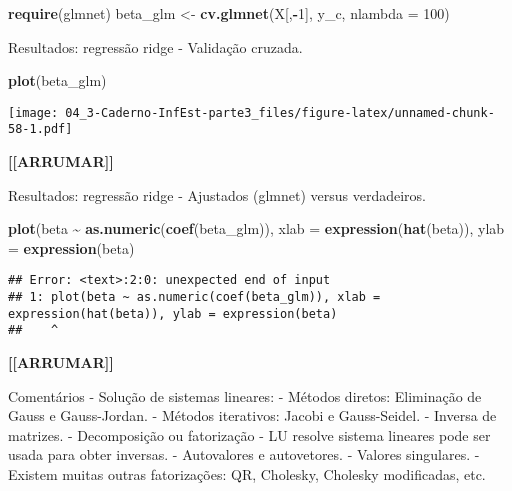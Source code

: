 \documentclass[
]{article}
\newenvironment{Shaded}{\begin{snugshade}}{\end{snugshade}}
\newcommand{\AttributeTok}[1]{\textcolor[rgb]{0.13,0.29,0.53}{#1}}
\newcommand{\DecValTok}[1]{\textcolor[rgb]{0.00,0.00,0.81}{#1}}
\newcommand{\FunctionTok}[1]{\textcolor[rgb]{0.13,0.29,0.53}{\textbf{#1}}}
\newcommand{\NormalTok}[1]{#1}
\newcommand{\OtherTok}[1]{\textcolor[rgb]{0.56,0.35,0.01}{#1}}
\newcommand{\SpecialCharTok}[1]{\textcolor[rgb]{0.81,0.36,0.00}{\textbf{#1}}}
\begin{document}
\begin{Shaded}
\begin{Highlighting}[]
\FunctionTok{require}\NormalTok{(glmnet)}
\NormalTok{beta\_glm }\OtherTok{\textless{}{-}} \FunctionTok{cv.glmnet}\NormalTok{(X[,}\SpecialCharTok{{-}}\DecValTok{1}\NormalTok{], y\_c, }\AttributeTok{nlambda =} \DecValTok{100}\NormalTok{)}
\end{Highlighting}
\end{Shaded}

Resultados: regressão ridge - Validação cruzada.

\begin{Shaded}
\begin{Highlighting}[]
\FunctionTok{plot}\NormalTok{(beta\_glm)}
\end{Highlighting}
\end{Shaded}

\texttt{[image: 04\_3-Caderno-InfEst-parte3\_files/figure-latex/unnamed-chunk-58-1.pdf]}

\textbf{{[}{[}ARRUMAR{]}{]}}

Resultados: regressão ridge - Ajustados (glmnet) versus verdadeiros.

\begin{Shaded}
\begin{Highlighting}[]
\FunctionTok{plot}\NormalTok{(beta }\SpecialCharTok{\textasciitilde{}} \FunctionTok{as.numeric}\NormalTok{(}\FunctionTok{coef}\NormalTok{(beta\_glm)), }\AttributeTok{xlab =} \FunctionTok{expression}\NormalTok{(}\FunctionTok{hat}\NormalTok{(beta)), }\AttributeTok{ylab =} \FunctionTok{expression}\NormalTok{(beta)}
\end{Highlighting}
\end{Shaded}

\begin{verbatim}
## Error: <text>:2:0: unexpected end of input
## 1: plot(beta ~ as.numeric(coef(beta_glm)), xlab = expression(hat(beta)), ylab = expression(beta)
##    ^
\end{verbatim}

\textbf{{[}{[}ARRUMAR{]}{]}}

Comentários - Solução de sistemas lineares: - Métodos diretos:
Eliminação de Gauss e Gauss-Jordan. - Métodos iterativos: Jacobi e
Gauss-Seidel. - Inversa de matrizes. - Decomposição ou fatorização - LU
resolve sistema lineares pode ser usada para obter inversas. -
Autovalores e autovetores. - Valores singulares. - Existem muitas outras
fatorizações: QR, Cholesky, Cholesky modificadas, etc.
\end{document}
